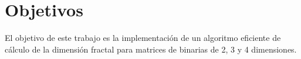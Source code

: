 \chapter{Objetivos}

El objetivo de este trabajo es la implementación de un algoritmo eficiente de cálculo de la dimensión fractal para matrices de binarias de 2, 3 y 4 dimensiones.
